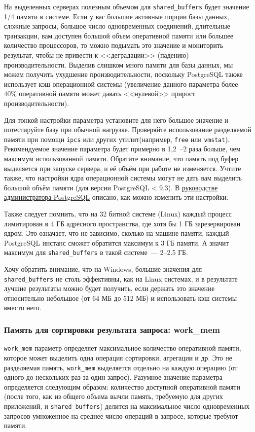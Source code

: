 На выделенных серверах полезным объемом для \lstinline!shared_buffers! будет значение 1/4 памяти в системе. Если у вас большие активные порции базы данных, сложные запросы, большое число одновременных соединений, длительные транзакции, вам доступен большой объем оперативной памяти или большее количество процессоров, то можно подымать это значение и мониторить результат, чтобы не привести к <<деградации>> (падению) производительности. Выделив слишком много памяти для базы данных, мы можем получить ухудшение производительности, поскольку PostgreSQL также использует кэш операционной системы (увеличение данного параметра более 40\% оперативной памяти может давать <<нулевой>> прирост производительности).

Для тонкой настройки параметра установите для него большое значение и потестируйте базу при обычной нагрузке. Проверяйте использование разделяемой памяти при помощи \lstinline!ipcs! или других утилит(например, \lstinline!free! или \lstinline!vmstat!). Рекомендуемое значение параметра будет примерно в 1,2~--2 раза больше, чем максимум использованной памяти. Обратите внимание, что память под буфер выделяется при запуске сервера, и её объём при работе не изменяется. Учтите также, что настройки ядра операционной системы могут не дать вам выделить большой объём памяти (для версии PostgreSQL < 9.3). В \href{http://www.postgresql.org/docs/current/static/kernel-resources.html}{руководстве администратора PostgreSQL} описано, как можно изменить эти настройки.

Также следует помнить, что на 32 битной системе (Linux) каждый процесс лимитирован в 4 ГБ адресного пространства, где хотя бы 1 ГБ зарезервирован ядром. Это означает, что не зависимо, сколько на машине памяти, каждый PostgreSQL инстанс сможет обратится максимум к 3 ГБ памяти. А значит максимум для \lstinline!shared_buffers! в такой системе~--- 2--2.5 ГБ.

Хочу обратить внимание, что на Windows, большие значения для \lstinline!shared_buffers! не столь эффективны, как на Linux системах, и в результате лучшие результаты можно будет получить, если держать это значение относительно небольшое (от 64 МБ до 512 МБ) и использовать кэш системы вместо него.


\subsubsection{Память для сортировки результата запроса: work\_mem}


\lstinline!work_mem! параметр определяет максимальное количество оперативной памяти, которое может выделить одна операция сортировки, агрегации и др. Это не разделяемая память, \lstinline!work_mem! выделяется отдельно на каждую операцию (от одного до нескольких раз за один запрос). Разумное значение параметра определяется следующим образом: количество доступной оперативной памяти (после того, как из общего объема вычли память, требуемую для других приложений, и \lstinline!shared_buffers!) делится на максимальное число одновременных запросов умноженное на среднее число операций в запросе, которые требуют памяти.

